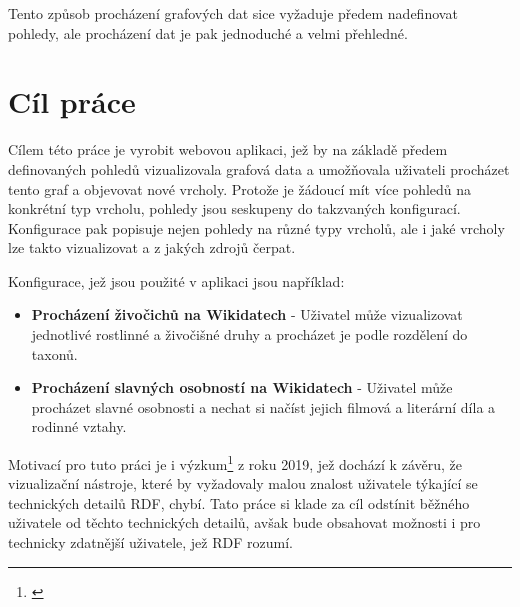 Tento způsob procházení grafových dat sice vyžaduje předem nadefinovat pohledy, ale procházení dat je pak jednoduché a velmi přehledné.

\section{Cíl práce}

Cílem této práce je vyrobit webovou aplikaci, jež by na základě předem definovaných pohledů vizualizovala grafová data a umožňovala uživateli procházet tento graf a objevovat nové vrcholy. Protože je žádoucí mít více pohledů na konkrétní typ vrcholu, pohledy jsou seskupeny do takzvaných konfigurací. Konfigurace pak popisuje nejen pohledy na různé typy vrcholů, ale i jaké vrcholy lze takto vizualizovat a z jakých zdrojů čerpat.

Konfigurace, jež jsou použité v aplikaci jsou například:
\begin{itemize}
    \item \textbf{Procházení živočichů na Wikidatech} - Uživatel může vizualizovat jednotlivé rostlinné a živočišné druhy a procházet je podle rozdělení do taxonů.
    \item \textbf{Procházení slavných osobností na Wikidatech} - Uživatel může procházet slavné osobnosti a nechat si načíst jejich filmová a literární díla a rodinné vztahy.
\end{itemize}

Motivací pro tuto práci je i výzkum\footnote{\citet{Klimek2019}} z roku 2019, jež dochází k závěru, že vizualizační nástroje, které by vyžadovaly malou znalost uživatele týkající se technických detailů RDF, chybí. Tato práce si klade za cíl odstínit běžného uživatele od těchto technických detailů, avšak bude obsahovat možnosti i pro technicky zdatnější uživatele, jež RDF rozumí.
